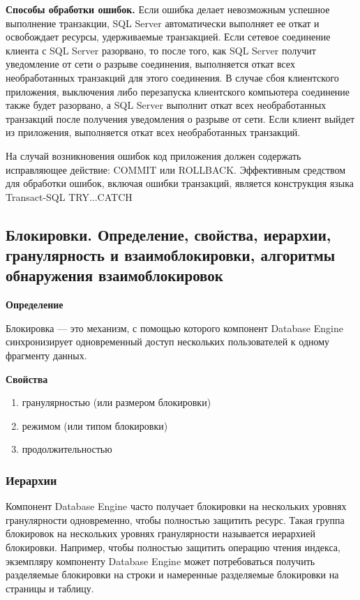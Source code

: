 \textbf{Способы обработки ошибок.}
Если ошибка делает невозможным успешное выполнение транзакции, SQL Server автоматически выполняет ее откат и 
освобождает ресурсы, удерживаемые транзакцией. Если сетевое соединение клиента с SQL Server разорвано, то после  того, как SQL Server получит уведомление от сети о разрыве соединения, выполняется откат всех необработанных транзакций для этого соединения. В случае сбоя клиентского приложения, выключения либо перезапуска клиентского компьютера соединение также будет разорвано, а SQL Server выполнит откат всех необработанных транзакций после получения уведомления о разрыве от сети. Если клиент выйдет из приложения, выполняется откат всех необработанных транзакций.

На случай возникновения ошибок код приложения должен содержать исправляющее действие: COMMIT или 
ROLLBACK. Эффективным средством для обработки ошибок, включая ошибки транзакций, является конструкция языка 
Transact-SQL TRY...CATCH


\subsection{Блокировки. Определение, свойства, иерархии, гранулярность и взаимоблокировки, алгоритмы обнаружения взаимоблокировок}

\textbf{Определение}

Блокировка --- это механизм, с помощью которого компонент Database Engine
синхронизирует одновременный доступ нескольких пользователей к одному фрагменту данных.

\textbf{Свойства}

\begin{enumerate}
	\item гранулярностью (или размером блокировки)
	\item режимом (или типом блокировки)
	\item продолжительностью
\end{enumerate}

\subsubsection{Иерархии}

Компонент Database Engine часто получает блокировки на нескольких уровнях гранулярности одновременно, чтобы полностью защитить ресурс. Такая группа блокировок на нескольких уровнях гранулярности называется иерархией блокировки. Например, чтобы полностью защитить операцию чтения индекса, экземпляру компоненту Database Engine может потребоваться получить разделяемые блокировки на строки и намеренные разделяемые блокировки на страницы и таблицу.


